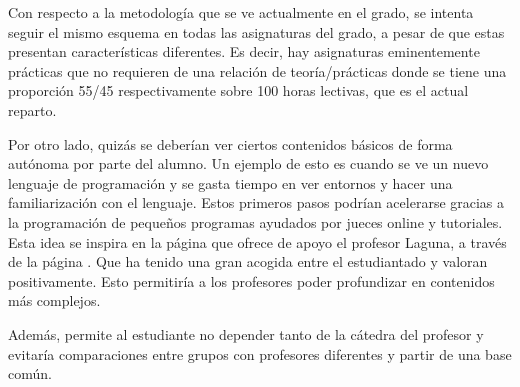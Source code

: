 Con respecto a la metodología que se ve actualmente en el grado, se intenta
seguir el mismo esquema en todas las asignaturas del grado, a pesar de que
estas presentan características diferentes. Es decir, hay asignaturas
eminentemente prácticas que no requieren de una relación de teoría/prácticas
donde se tiene una proporción 55/45 respectivamente sobre 100 horas lectivas, 
que es el actual reparto.

Por otro lado, quizás se deberían ver ciertos contenidos básicos de forma
autónoma por parte del alumno. Un ejemplo de esto es cuando se ve un nuevo
lenguaje de programación y se gasta tiempo en ver entornos y hacer una 
familiarización con el lenguaje. Estos primeros pasos podrían acelerarse
gracias a la programación de pequeños programas ayudados por jueces online y
tutoriales. Esta idea se inspira en la página que ofrece de apoyo el profesor %
Laguna, a través de la página
. Que ha tenido una gran acogida entre el estudiantado y valoran positivamente.
Esto permitiría a los profesores poder profundizar en contenidos más complejos.

Además, permite al estudiante no depender tanto de la cátedra del profesor y evitaría
comparaciones entre grupos con profesores diferentes y partir de una base común.